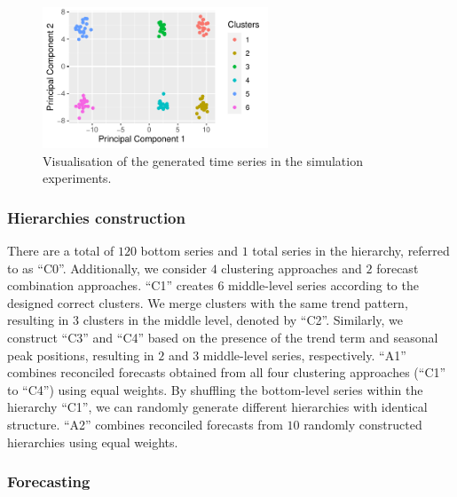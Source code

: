 \documentclass[a4paper,review,12pt,authoryear]{elsarticle}
\begin{document}
\begin{figure}
    \centering
    \includegraphics[width=0.6\textwidth]{figures/simu_pca.pdf}
    \caption{\label{fig:simu_pca}Visualisation of the generated time series in the simulation experiments.}
\end{figure}


\subsubsection*{Hierarchies construction}

There are a total of $120$ bottom series and $1$ total series in the hierarchy, referred to as ``C0''. Additionally, we consider $4$ clustering approaches and $2$ forecast combination approaches. ``C1'' creates $6$ middle-level series according to the designed correct clusters. We merge clusters with the same trend pattern, resulting in $3$ clusters in the middle level, denoted by ``C2''. Similarly, we construct ``C3'' and ``C4'' based on the presence of the trend term and seasonal peak positions, resulting in $2$ and $3$ middle-level series, respectively. ``A1'' combines reconciled forecasts obtained from all four clustering approaches (``C1'' to ``C4'') using equal weights. By shuffling the bottom-level series within the hierarchy ``C1'', we can randomly generate different hierarchies with identical structure. ``A2'' combines reconciled forecasts from $10$ randomly constructed hierarchies using equal weights.

\subsubsection*{Forecasting}
\end{document}

